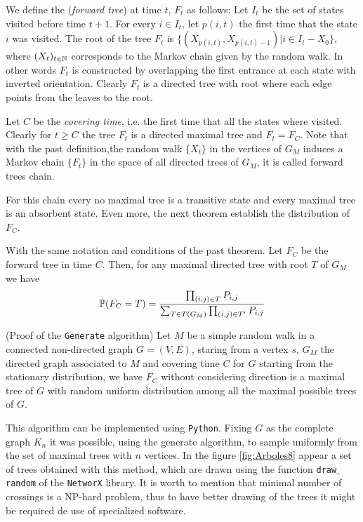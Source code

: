 We define the (\textit{forward tree}) at time $t$, $F_{t}$ as follows: Let $I_{t}$ be the set of states visited before time $t+1$. For every $i\in I_{t}$, let $p(i,t)$ the first time that the state $i$ was visited. The root of the tree $F_{t}$ is $\{(X_{p(i,t)},X_{p(i,t)-1}) | i\in I_{t}-X_{0}\}$, where $(X_{t})_{t\in \N}$ corresponds to the Markov chain given by the random walk. In other words $F_{t}$ is constructed by overlapping the first entrance at each state with inverted orientation. Clearly $F_{t}$ is a directed tree with root where each edge points from the leaves to the root.

Let $C$ be the \textit{covering time}, i.e. the first time that all the states where visited. Clearly for $t\geq C$ the tree $F_{t}$ is a directed maximal tree and $F_{t}=F_{C}$. Note that with the past definition,the random walk $\{X_{t}\}$ in the vertices of $G_{M}$ induces a Markov chain $\{F_{t}\}$ in the space of all directed trees of $G_{M}$, it is called forward trees chain.

For this chain every no maximal tree is a transitive state and every maximal tree is an absorbent state. Even more, the next theorem establish the distribution of  $F_{C}$.

\begin{theorem}
With the same notation and conditions of the past theorem. Let $F_{C}$ be the forward tree in time $C$. Then, for any maximal directed tree with root $T$ of $G_{M}$ we have
$$\P(F_{C} = T) = \frac{\prod_{(i,j)\in T} P_{i,j}}{\sum_{T\in T(G_{M})} \prod_{(i,j)\in T'} P_{i,j}}$$
\end{theorem}

\begin{coro}
(Proof of the \texttt{Generate} algorithm) Let $M$ be a simple random walk in a connected non-directed graph $G = (V, E)$, staring from a vertex $s$, $G_{M}$ the directed graph associated to $M$ and covering time $C$ for $G$ starting from the stationary distribution, we have $F_{C}$ without considering direction is a maximal tree of $G$ with random uniform distribution among all the maximal possible trees of $G$.
\end{coro}

This algorithm can be implemented using \texttt{Python}. Fixing $G$ as the complete graph $K_{n}$ it was possible, using the generate algorithm, to sample uniformly from the set of maximal trees with $n$ vertices. In the figure \ref{fig:Arboles8} appear a set of trees obtained with this method, which are drawn using the function \texttt{draw$\_$random} of the \texttt{NetworX} library. It is worth to mention that minimal number of crossings is a NP-hard problem, thus to have better drawing of the trees it might be required de use of specialized software.

